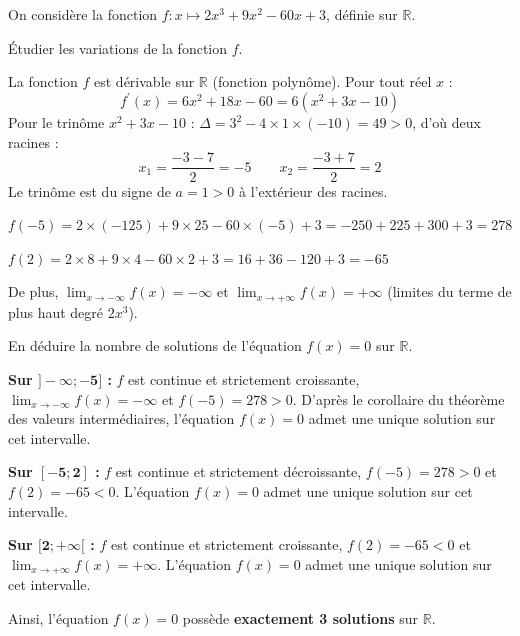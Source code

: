 \documentclass[11pt,a4paper]{article}  %
\begin{document}
	\exerciceDS{}
	
	On considère la fonction $f: x \mapsto 2 x^3+9 x^2-60 x+3$, définie sur $\mathbb{R}$.
	\begin{enumMet}
		\item Étudier les variations de la fonction $f$.
		
		\begin{corrBox}
			La fonction $f$ est dérivable sur $\mathbb{R}$ (fonction polynôme). Pour tout réel $x$ :
			\[f^{\prime}(x)=6 x^2+18 x-60=6\left(x^2+3 x-10\right)\]
			Pour le trinôme $x^2+3x-10$ : $\Delta=3^2-4\times1\times(-10)=49>0$, d'où deux racines :
			\[x_1=\dfrac{-3-7}{2}=-5 \qquad x_2=\dfrac{-3+7}{2}=2\]
			Le trinôme est du signe de $a=1>0$ à l'extérieur des racines.
			
			$f(-5)=2\times(-125)+9\times25-60\times(-5)+3=-250+225+300+3=278$
			
			$f(2)=2\times8+9\times4-60\times2+3=16+36-120+3=-65$
			
			De plus, $\displaystyle\lim _{x \to -\infty} f(x)=-\infty$ et $\displaystyle\lim _{x \to +\infty} f(x)=+\infty$ (limites du terme de plus haut degré $2x^3$).
			
			\begin{center}
			\end{center}
		\end{corrBox}
		
		\item En déduire la nombre de solutions de l'équation $f(x)=0$ sur $\mathbb{R}$.
		
		\begin{corrBox}
			\textbf{Sur $\bm{]-\infty ;-5]}$ :} $f$ est continue et strictement croissante, $\displaystyle\lim _{x \to -\infty} f(x)=-\infty$ et $f(-5)=278>0$. D'après le corollaire du théorème des valeurs intermédiaires, l'équation $f(x)=0$ admet une unique solution sur cet intervalle.
			
			\textbf{Sur $\bm{[-5 ; 2]}$ :} $f$ est continue et strictement décroissante, $f(-5)=278>0$ et $f(2)=-65<0$. L'équation $f(x)=0$ admet une unique solution sur cet intervalle.
			
			\textbf{Sur $\bm{[2 ;+\infty[}$ :} $f$ est continue et strictement croissante, $f(2)=-65<0$ et $\displaystyle\lim _{x \to +\infty} f(x)=+\infty$. L'équation $f(x)=0$ admet une unique solution sur cet intervalle.
			
			Ainsi, l'équation $f(x)=0$ possède \textbf{exactement 3 solutions} sur $\mathbb{R}$.
		\end{corrBox}
	\end{enumMet}
	
\end{document}
